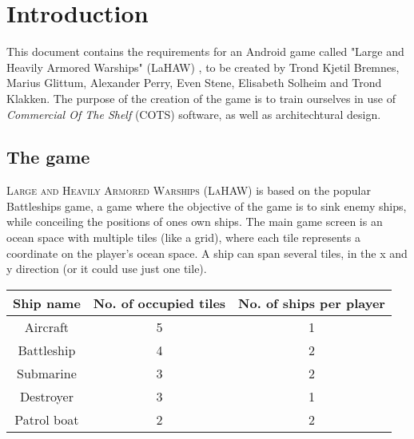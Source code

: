 \chapter{Introduction}
This document contains the requirements for an Android game called "Large and Heavily Armored Warships" (LaHAW) , to be created by Trond Kjetil Bremnes, Marius Glittum, Alexander Perry, Even Stene, Elisabeth Solheim and Trond Klakken. The purpose of the creation of the game is to train ourselves in use of \emph{Commercial Of The Shelf} (COTS) software, as well as architechtural design.

\section{The game}
\textsc{Large and Heavily Armored Warships (LaHAW)} is based on the popular Battleships\cite{battleship} game, a game where the objective of the game is to sink enemy ships, while conceiling the positions of ones own ships. The main game screen is an ocean space with multiple tiles (like a grid), where each tile represents a coordinate on the player's ocean space. A ship can span several tiles, in the x and y direction (or it could use just one tile). 
\\


\begin{tabular}{| c | c | c |}
    \hline
    \rowcolor[gray]{0.8}
    \hspace{0.3cm}\textbf{Ship name}\hspace{0.3cm} & \textbf{No. of occupied tiles} & \textbf{No. of ships per player} \\
    \hline
    Aircraft & 5 & 1 \\
    Battleship & 4 & 2 \\
    Submarine & 3 & 2 \\
    Destroyer & 3 & 1 \\
    Patrol boat & 2 & 2 \\
    \hline
\end{tabular}
\label{shiptable}